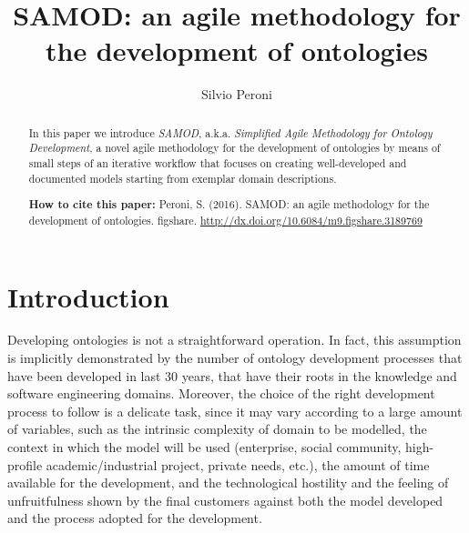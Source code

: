 \documentclass[runningheads,a4paper]{llncs}
\begin{document}
\mainmatter

\title{SAMOD: an agile methodology for the development of ontologies}
\author{Silvio Peroni}

\maketitle

\begin{abstract}
In this paper we introduce {\em SAMOD}, a.k.a. {\em Simplified Agile Methodology for Ontology Development}, a novel agile methodology for the development of ontologies by means of small steps of an iterative workflow that focuses on creating well-developed and documented models starting from exemplar domain descriptions.

{\bf How to cite this paper:} Peroni, S. (2016). SAMOD: an agile methodology for the development of ontologies. figshare. \url{http://dx.doi.org/10.6084/m9.figshare.3189769}

\end{abstract}


\section{Introduction}\label{__RefHeading__2452_1461357291}

Developing ontologies is not a straightforward operation. In fact, this assumption is implicitly demonstrated by the number of ontology development processes that have been developed in last 30 years, that have their roots in the knowledge and software engineering domains. Moreover, the choice of the right development process to follow is a delicate task, since it may vary according to a large amount of variables, such as the intrinsic complexity of domain to be modelled, the context in which the model will be used (enterprise, social community, high-profile academic/industrial project, private needs, etc.), the amount of time available for the development, and the technological hostility and the feeling of unfruitfulness shown by the final customers against both the model developed and the process adopted for the development.
\end{document}
